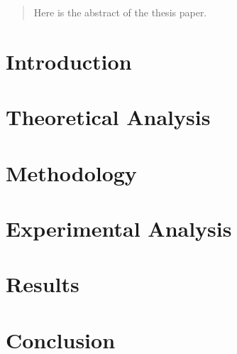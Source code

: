 \documentclass[12pt, a4paper]{report}
\author{oslo@itu.dk&ppho@itu.dk}
\begin{document}
\sffamily

%

\listoftodos



\begin{abstract}
Here is the abstract of the thesis paper.
\end{abstract}

\tableofcontents
\newpage



\chapter{Introduction}
\label{chap:introduction}


\restoregeometry
\newpage

\chapter{Theoretical Analysis}
\label{chap:theory}


\restoregeometry
\newpage

\chapter{Methodology}
\label{chap:methodology}


\restoregeometry
\newpage

\chapter{Experimental Analysis}
\label{chap:experimentalAnalysis}


\restoregeometry
\newpage

\chapter{Results}
\label{chap:results}

\restoregeometry
\newpage

\chapter{Conclusion}
\label{chap:conclusion}

%
\restoregeometry
\newpage

\printbibliography
\end{document}

